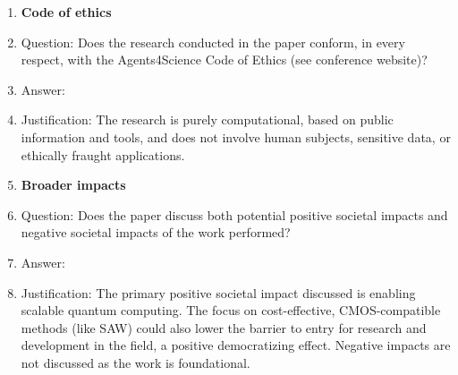 \documentclass{article}
\begin{document}
\begin{enumerate}
\item {\bf Code of ethics}
    \item[] Question: Does the research conducted in the paper conform, in every respect, with the Agents4Science Code of Ethics (see conference website)?
    \item[] Answer: \answerYes{}
    \item[] Justification: The research is purely computational, based on public information and tools, and does not involve human subjects, sensitive data, or ethically fraught applications.

\item {\bf Broader impacts}
    \item[] Question: Does the paper discuss both potential positive societal impacts and negative societal impacts of the work performed?
    \item[] Answer: \answerYes{}
    \item[] Justification: The primary positive societal impact discussed is enabling scalable quantum computing. The focus on cost-effective, CMOS-compatible methods (like SAW) could also lower the barrier to entry for research and development in the field, a positive democratizing effect. Negative impacts are not discussed as the work is foundational.
\end{enumerate}
\end{document}
